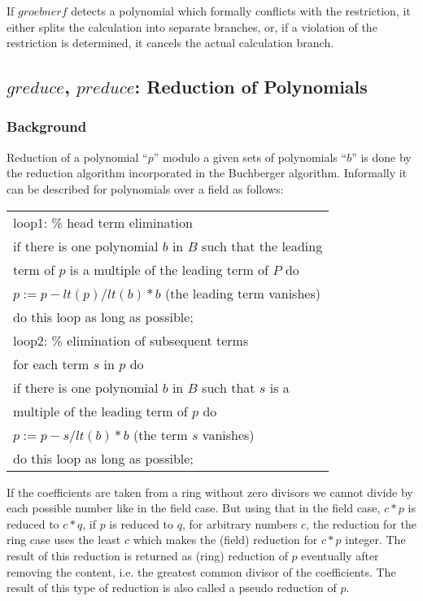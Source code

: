 If $groebnerf$ detects a polynomial which formally conflicts with the
restriction, it either splits the calculation into separate branches, or,
if a violation of the restriction is determined, it cancels the actual
calculation branch.

\subsection{$greduce$, $preduce$: Reduction of Polynomials}

\subsubsection{Background} \label{groebner:background}
Reduction of a polynomial ``$p$'' modulo a given sets of polynomials
``$b$'' is done by the reduction algorithm incorporated in the
Buchberger algorithm. Informally it can be described for
polynomials over a field as follows:
\begin{center}
\begin{tabular}{l}
loop1: \hspace*{2mm}\% head term elimination \\
\hspace*{-1cm} if there is one polynomial $b$ in $B$ such that the
leading \\ term of $p$ is a multiple of the leading term of $P$ do \\
$p := p - lt(p)/lt(b) * b$  (the leading term vanishes)\\
\hspace*{-1cm} do this loop as long as possible; \\
loop2: \hspace*{2mm} \% elimination of subsequent terms \\
\hspace*{-1cm} for each term $s$ in $p$ do \\
if there is one polynomial $b$ in $B$ such that $s$ is a\\
multiple of the leading term of $p$ do \\
$p := p - s/lt(b) * b$ (the term $s$ vanishes) \\
\hspace*{-1cm}do this loop as long as possible;
\end{tabular}
\end{center}

If the coefficients are taken from a ring without zero divisors we
cannot divide by each possible number like in the field case. But
using that in the field case,  $c*p $ is reduced to  $c*q $, if $ p $
is reduced to $ q $, for arbitrary numbers $ c $,  the reduction for
the ring case uses the least $ c $ which makes the (field) reduction
for $ c*p $ integer. The result of this reduction is returned as
(ring) reduction of $ p $ eventually after removing the content, i.e.
the greatest common divisor of the coefficients. The result of this
type of reduction is also called a pseudo reduction of $ p $.

